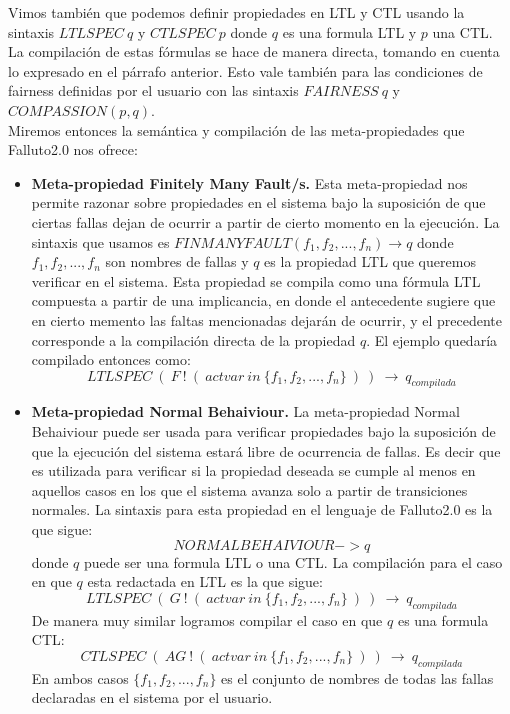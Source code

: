 \documentclass[titlepage, 12pt]{book}
\begin{document}
Vimos tambi\'en que podemos definir propiedades en LTL y CTL usando la sintaxis $LTLSPEC~q$ y $CTLSPEC~p$ donde $q$ es una formula LTL y $p$ una CTL. La compilaci\'on de estas f\'ormulas se hace de manera directa, tomando en cuenta lo expresado en el p\'arrafo anterior. Esto vale tambi\'en para las condiciones de fairness definidas por el usuario con las sintaxis $FAIRNESS~q$ y $COMPASSION(p,q)$.\\

Miremos entonces la sem\'antica y compilaci\'on de las meta-propiedades que Falluto2.0 nos ofrece:
\begin{itemize}
\item \textbf{Meta-propiedad Finitely Many Fault/s.} Esta meta-propiedad nos permite razonar sobre propiedades en el sistema bajo la suposici\'on de que ciertas fallas dejan de ocurrir a partir de cierto momento en la ejecuci\'on. La sintaxis que usamos es $FINMANYFAULT(f_1,f_2,...,f_n) \rightarrow q$ donde $f_1,f_2,...,f_n$ son nombres de fallas y $q$ es la propiedad LTL que queremos verificar en el sistema. Esta propiedad se compila como una f\'ormula LTL compuesta a partir de una implicancia, en donde el antecedente sugiere que en cierto memento las faltas mencionadas dejar\'an de ocurrir, y el precedente corresponde a la compilaci\'on directa de la propiedad $q$. El ejemplo quedar\'ia compilado entonces como:
$$LTLSPEC~(~F~!~(~actvar~in~\lbrace f_1,f_2,...,f_n \rbrace~)~)~\rightarrow~q_{compilada}$$
\item \textbf{Meta-propiedad Normal Behaiviour.} La meta-propiedad Normal Behaiviour puede ser usada para verificar propiedades bajo la suposici\'on de que la ejecuci\'on del sistema estar\'a libre de ocurrencia de fallas. Es decir que es utilizada para verificar si la propiedad deseada se cumple al menos en aquellos casos en los que el sistema avanza solo a partir de transiciones normales. La sintaxis para esta propiedad en el lenguaje de Falluto2.0 es la que sigue: $$NORMALBEHAIVIOUR -> q$$ donde $q$ puede ser una formula LTL o una CTL. La compilaci\'on para el caso en que $q$ esta redactada en LTL es la que sigue: 
$$LTLSPEC~(~G~!~(~actvar~in~\lbrace f_1, f_2,..., f_n\rbrace~)~)~\rightarrow~q_{compilada}$$
De manera muy similar logramos compilar el caso en que $q$ es una formula CTL:
$$CTLSPEC~(~AG~!~(~actvar~in~\lbrace f_1, f_2,..., f_n\rbrace~)~)~\rightarrow~q_{compilada}$$
En ambos casos $\lbrace f_1, f_2,..., f_n\rbrace$ es el conjunto de nombres de todas las fallas declaradas en el sistema por el usuario.
\end{itemize}
\end{document}
